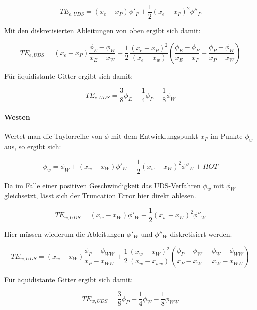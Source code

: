 \documentclass[11pt, ngerman,colorback,accentcolor=tud2d]{tudreport}
\begin{document}
\begin{equation*}
  TE_{e, UDS} = (x_e-x_P) \phi'_P + \frac{1}{2} (x_e-x_P)^2 \phi''_P
\end{equation*}

Mit den diskretisierten Ableitungen von oben ergibt sich damit:

\begin{equation}
  TE_{e, UDS} = (x_e-x_P) \frac{\phi_E-\phi_W}{x_E-x_W}+
  \frac{1}{2} \frac{(x_e-x_P)^2}{(x_e-x_w)} \left({\frac{\phi_E-\phi_P}{x_E-x_P}
  - \frac{\phi_P-\phi_W}{x_P-x_W} }\right)
\end{equation}

Für äquidistante Gitter ergibt sich damit:

\begin{equation}
  TE_{e, UDS} = \frac{3}{8} \phi_E-\frac{1}{4} \phi_P - \frac{1}{8} \phi_W
\end{equation}


\paragraph{Westen}

Wertet man die Taylorreihe von $\phi$ mit dem Entwicklungspunkt $x_P$ im Punkte $\phi_w$
aus, so ergibt sich:

\begin{equation*}
  \phi_w = \phi_W +(x_w-x_W) \phi'_W + \frac{1}{2} (x_w-x_W)^2 \phi''_W+HOT
\end{equation*}

Da im Falle einer positiven Geschwindigkeit das UDS-Verfahren $\phi_w$ mit $\phi_W$
gleichsetzt, lässt sich der Truncation Error hier direkt ablesen.

\begin{equation*}
  TE_{w, UDS} = (x_w-x_W) \phi'_W + \frac{1}{2} (x_w-x_W)^2 \phi''_W
\end{equation*}

Hier müssen wiederum die Ableitungen $\phi'_W$ und $\phi''_W$ diskretisiert werden.

\begin{equation}
  TE_{w, UDS} = (x_w-x_W) \frac{\phi_P-\phi_{WW}}{x_P-x_{WW}}+
  \frac{1}{2} \frac{(x_w-x_W)^2}{(x_w-x_{ww})} \left({\frac{\phi_P-\phi_W}{x_P-x_W}
  - \frac{\phi_W-\phi_{WW}}{x_W-x_{WW}} }\right)
\end{equation}

Für äquidistante Gitter ergibt sich damit:

\begin{equation}
  TE_{w, UDS} = \frac{3}{8} \phi_P-\frac{1}{4} \phi_W - \frac{1}{8} \phi_{WW}
\end{equation}
\end{document}
